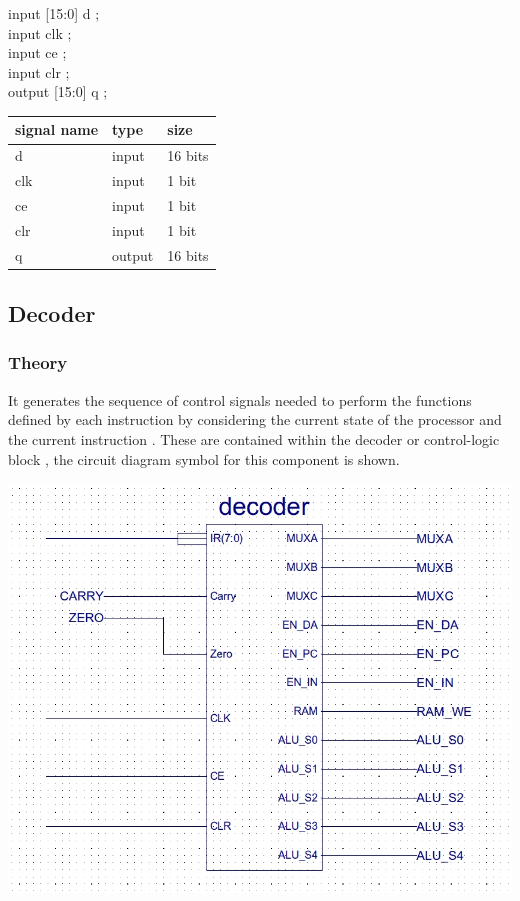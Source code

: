 \documentclass[11pt]{article}
\begin{document}
input  [15:0] d     ; \\
input         clk   ;   \\
input         ce    ; \\
input         clr   ; \\
output [15:0] q     ; \\

\begin{center}
\begin{tabular}{lll}
signal name & type & size\\
\hline
d & input & 16 bits\\
clk & input & 1 bit\\
ce & input & 1 bit\\
clr & input & 1 bit\\
q & output & 16 bits\\
\hline
\end{tabular}
\end{center}

\subsection{Decoder}
\label{sec:orgbe19e98}
\subsubsection{Theory}
\label{sec:org9b46a3a}
It generates the sequence of control signals needed to perform the functions defined by each instruction by considering the current state of the processor and the current instruction . These are contained within the decoder or control-logic block , the circuit diagram symbol for this component is shown.
\begin{center}
\includegraphics[width=.9\linewidth]{./images/decoder_sym.jpg}
\end{center}
\end{document}
